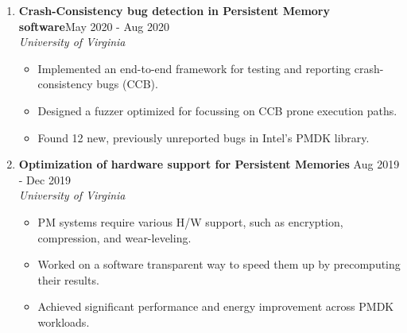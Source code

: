 \documentclass{article}
\newlength{\workexitemsep}
\newlength{\projitemsep}
\begin{document}
\begin{enumerate}
        \item \textbf{Crash-Consistency bug detection in Persistent Memory software}\hfill{}May 2020 - Aug 2020\\
    \textit{University of Virginia}\vspace{-0.15cm}
    \begin{itemize}[itemsep=\projitemsep]
            \item Implemented an end-to-end framework for testing and reporting crash-consistency bugs (CCB).
            \item Designed a fuzzer optimized for focussing on CCB prone execution paths.
            \item Found 12 new, previously unreported bugs in Intel's PMDK library.
    \end{itemize}

        \item \textbf{Optimization of hardware support for Persistent Memories} \hfill{}Aug 2019 - Dec 2019\\
    \textit{University of Virginia}\vspace{-0.15cm}
    \begin{itemize}[itemsep=\projitemsep]
             \item PM systems require various H/W support, such as encryption, compression, and wear-leveling.
             \item Worked on a software transparent way to speed them up by precomputing their results.
             \item Achieved significant performance and energy improvement across PMDK workloads.
    \end{itemize}




\end{enumerate}
\end{document}
